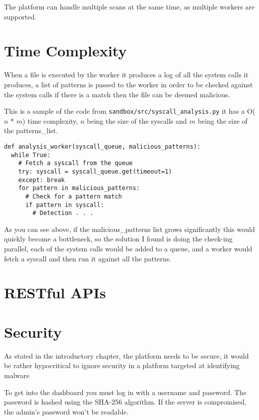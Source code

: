 The platform can handle multiple scans at the same time, as multiple workers are supported.

\section{Time Complexity}
When a file is executed by the worker it produces a log of all the
system calls it produces, a list of patterns is passed to
the worker in order to be checked against the system calls
if there is a match then the file can be deemed malicious.

This is a sample of the code from \texttt{sandbox/src/syscall\_analysis.py}
it has a O($n$ * $m$) time complexity, $n$ being the size of the syscalls
and $m$ being the size of the patterns\_list.
\begin{lstlisting}
def analysis_worker(syscall_queue, malicious_patterns):
  while True:
    # Fetch a syscall from the queue
    try: syscall = syscall_queue.get(timeout=1)
    except: break
    for pattern in malicious_patterns:
      # Check for a pattern match
      if pattern in syscall:
        # Detection . . .
\end{lstlisting}

As you can see above, if the malicious\_patterns list grows
significantly this would quickly become a bottleneck,
so the solution I found is doing the check-ing parallel,
each of the system calls would be added to a queue,
and a worker would fetch a syscall and then run it against all the patterns.


\section{RESTful APIs}


\section{Security}
As stated in the introductory chapter, the platform needs to be secure,
it would be rather hypocritical to ignore security in a
platform targeted at identifying malware

To get into the dashboard you must log in with a username and password.
The password is hashed using the SHA-256 algorithm.
If the server is compromised, the admin's password won't be readable.

